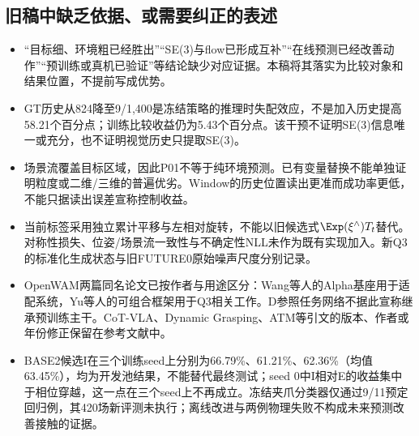 \subsection*{旧稿中缺乏依据、或需要纠正的表述}

\begin{itemize}
\item “目标细、环境粗已经胜出”“SE(3)与flow已形成互补”“在线预测已经改善动作”“预训练或真机已验证”等结论缺少对应证据。本稿将其落实为比较对象和结果位置，不提前写成优势。
\item GT历史从824降至9/1,400是冻结策略的推理时失配效应，不是加入历史提高58.21个百分点；训练比较收益仍为5.43个百分点。该干预不证明SE(3)信息唯一或充分，也不证明视觉历史只提取SE(3)。
\item 场景流覆盖目标区域，因此P01不等于纯环境预测。已有变量替换不能单独证明粒度或二维/三维的普遍优劣。Window的历史位置读出更准而成功率更低，不能只据读出误差宣称控制收益。
\item 当前标签采用独立累计平移与左相对旋转，不能以旧候选式$\Exp(\xi^\wedge)T_t$替代。对称性损失、位姿/场景流一致性与不确定性NLL未作为既有实现加入。新Q3的标准化生成状态与旧FUTURE0原始噪声尺度分别记录。
\item OpenWAM两篇同名论文已按作者与用途区分：Wang等人的Alpha基座用于适配系统，Yu等人的可组合框架用于Q3相关工作。D参照任务网络不据此宣称继承预训练主干。CoT-VLA、Dynamic Grasping、ATM等引文的版本、作者或年份修正保留在参考文献中。
\item BASE2候选I在三个训练seed上分别为66.79\%、61.21\%、62.36\%（均值63.45\%），均为开发池结果，不能替代最终测试；seed 0中I相对E的收益集中于相位穿越，这一点在三个seed上不再成立。冻结夹爪分类器仅通过9/11预定回归例，其420场新评测未执行；离线改进与两例物理失败不构成未来预测改善接触的证据。
\end{itemize}
